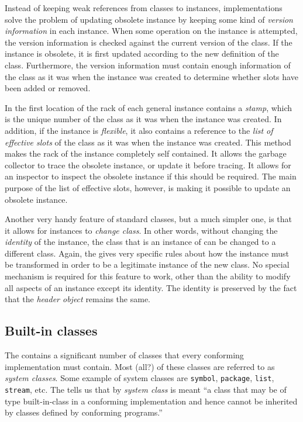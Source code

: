 Instead of keeping weak references from classes to instances,
implementations solve the problem of updating obsolete instance by
keeping some kind of \emph{version information} in each instance.
When some operation on the instance is attempted, the version
information is checked against the current version of the class.  If
the instance is obsolete, it is first updated according to the new
definition of the class.  Furthermore, the version information must
contain enough information of the class as it was when the instance
was created to determine whether slots have been added or removed.

In \sysname{} the first location of the rack of each
general instance contains a \emph{stamp}, which is the unique number
of the class as it was when the instance was created.  In addition,
if the instance is \emph{flexible}, it also contains a reference to the
\emph{list of effective slots} of the class as it was when the
instance was created.  This method makes the rack of the
instance completely self contained.  It allows the garbage collector
to trace the obsolete instance, or update it before tracing.  It
allows for an inspector to inspect the obsolete instance if this
should be required.  The main purpose of the list of effective slots,
however, is making it possible to update an obsolete instance.

Another very handy feature of standard classes, but a much simpler
one, is that it allows for instances to \emph{change class}.  In other
words, without changing the \emph{identity} of the instance, the class
that is an instance of can be changed to a different class.  Again,
the \hs{} gives very specific rules about how the instance must be
transformed in order to be a legitimate instance of the new class.  No
special mechanism is required for this feature to work, other than the
ability to modify all aspects of an instance except its identity.  The
identity is preserved by the fact that the \emph{header object}
remains the same. 

\subsection{Built-in classes}
\label{object-system-built-in-classes}

The \hs{} contains a significant number of classes that every
conforming implementation must contain.  Most (all?) of these classes
are referred to as \emph{system classes}.  Some example of system
classes are \texttt{symbol}, \texttt{package}, \texttt{list},
\texttt{stream}, etc.  The \hs{} tells us that by \emph{system
  class} is meant ``a class that may be of type built-in-class in a
conforming implementation and hence cannot be inherited by classes
defined by conforming programs.'' 

